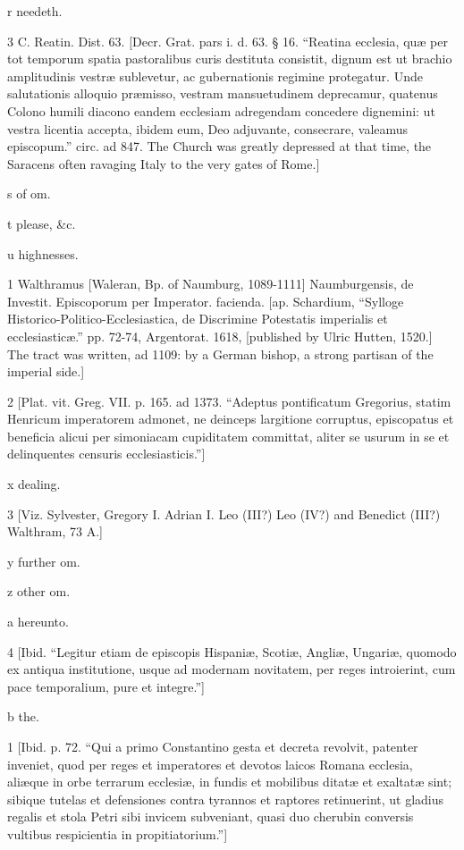 r
needeth.

3
C. Reatin. Dist. 63. [Decr. Grat. pars i. d. 63. § 16. “Reatina ecclesia, quæ per tot temporum spatia pastoralibus curis destituta consistit, dignum est ut brachio amplitudinis vestræ sublevetur, ac gubernationis regimine protegatur. Unde salutationis alloquio præmisso, vestram mansuetudinem deprecamur, quatenus Colono humili diacono eandem ecclesiam adregendam concedere dignemini: ut vestra licentia accepta, ibidem eum, Deo adjuvante, consecrare, valeamus episcopum.” circ. ad 847. The Church was greatly depressed at that time, the Saracens often ravaging Italy to the very gates of Rome.]

s
of om.

t
please, &c.

u
highnesses.

1
Walthramus [Waleran, Bp. of Naumburg, 1089-1111] Naumburgensis, de Investit. Episcoporum per Imperator. facienda. [ap. Schardium, “Sylloge Historico-Politico-Ecclesiastica, de Discrimine Potestatis imperialis et ecclesiasticæ.” pp. 72-74, Argentorat. 1618, [published by Ulric Hutten, 1520.] The tract was written, ad 1109: by a German bishop, a strong partisan of the imperial side.]

2
[Plat. vit. Greg. VII. p. 165. ad 1373. “Adeptus pontificatum Gregorius, statim Henricum imperatorem admonet, ne deinceps largitione corruptus, episcopatus et beneficia alicui per simoniacam cupiditatem committat, aliter se usurum in se et delinquentes censuris ecclesiasticis.”]

x
dealing.

3
[Viz. Sylvester, Gregory I. Adrian I. Leo (III?) Leo (IV?) and Benedict (III?) Walthram, 73 A.]

y
further om.

z
other om.

a
hereunto.

4
[Ibid. “Legitur etiam de episcopis Hispaniæ, Scotiæ, Angliæ, Ungariæ, quomodo ex antiqua institutione, usque ad modernam novitatem, per reges introierint, cum pace temporalium, pure et integre.”]

b
the.

1
[Ibid. p. 72. “Qui a primo Constantino gesta et decreta revolvit, patenter inveniet, quod per reges et imperatores et devotos laicos Romana ecclesia, aliæque in orbe terrarum ecclesiæ, in fundis et mobilibus ditatæ et exaltatæ sint; sibique tutelas et defensiones contra tyrannos et raptores retinuerint, ut gladius regalis et stola Petri sibi invicem subveniant, quasi duo cherubin conversis vultibus respicientia in propitiatorium.”]

